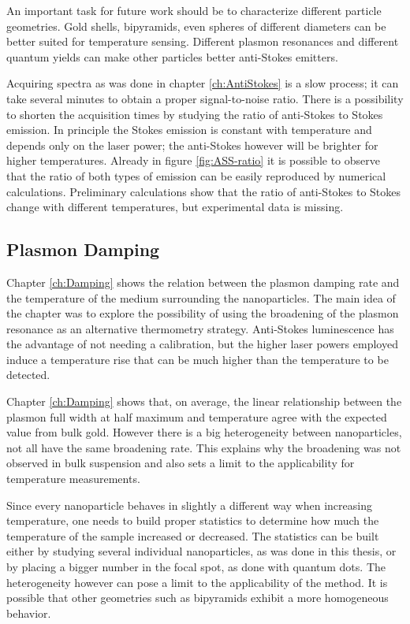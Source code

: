 An important task for future work should be to characterize different particle
geometries. Gold shells\cite{Gobin2007}, bipyramids\cite{Rao2015}, even spheres
of different diameters can be better suited for temperature sensing. Different
plasmon resonances and different quantum yields can make other particles better
anti-Stokes emitters.

Acquiring spectra as was done in chapter \ref{ch:AntiStokes} is a slow process;
it can take several minutes to obtain a proper signal-to-noise ratio. There is a
possibility to shorten the acquisition times by studying the ratio of
anti-Stokes to Stokes emission\cite{Pozzi2015}. In principle the Stokes emission
is constant with temperature and depends only on the laser power; the
anti-Stokes however will be brighter for higher temperatures. Already in figure
\ref{fig:ASS-ratio} it is possible to observe that the ratio of both types of
emission can be easily reproduced by numerical calculations. Preliminary
calculations show that the ratio of anti-Stokes to Stokes change with different
temperatures, but experimental data is missing.

\subsection{Plasmon Damping}
Chapter \ref{ch:Damping} shows the relation between the plasmon damping rate and
the temperature of the medium surrounding the nanoparticles. The main idea of
the chapter was to explore the possibility of using the broadening of the
plasmon resonance as an alternative thermometry strategy. Anti-Stokes
luminescence has the advantage of not needing a calibration, but the higher
laser powers employed induce a temperature rise that can be much higher than the
temperature to be detected.

Chapter \ref{ch:Damping} shows that, on average, the linear relationship between
the plasmon full width at half maximum and temperature agree with the expected
value from bulk gold. However there is a big heterogeneity between 
nanoparticles, not all have the same broadening rate. This explains why the
broadening was not observed in bulk suspension and also sets a limit to the
applicability for temperature measurements. 

Since every nanoparticle behaves in slightly a different way when increasing
temperature, one needs to build proper statistics to determine how much the
temperature of the sample increased or decreased. The statistics can be built
either by studying several individual nanoparticles, as was done in this thesis,
or by placing a bigger number in the focal spot, as done with quantum
dots\cite{Li2007}. The heterogeneity however can pose a limit to the
applicability of the method. It is possible that other geometries such as
bipyramids exhibit a more homogeneous behavior.

